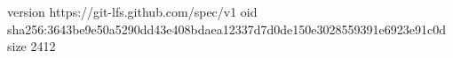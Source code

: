 version https://git-lfs.github.com/spec/v1
oid sha256:3643be9e50a5290dd43e408bdaea12337d7d0de150e3028559391e6923e91c0d
size 2412
